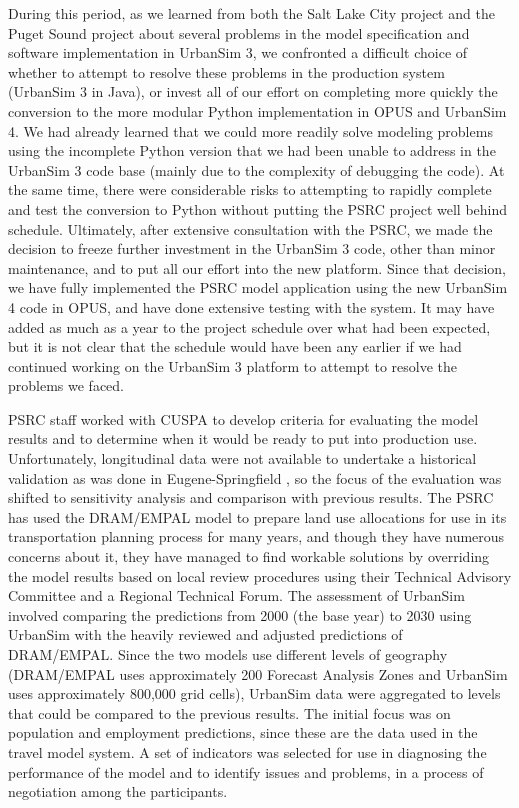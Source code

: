 During this period, as we learned from both the Salt Lake City
project and the Puget Sound project about several problems in the
model specification and software implementation in UrbanSim 3, we
confronted a difficult choice of whether to attempt to resolve these
problems in the production system (UrbanSim 3 in Java), or invest
all of our effort on completing more quickly the conversion to the
more modular Python implementation in OPUS and UrbanSim 4.  We had
already learned that we could more readily solve modeling problems
using the incomplete Python version that we had been unable to
address in the UrbanSim 3 code base (mainly due to the complexity of
debugging the code).  At the same time, there were considerable
risks to attempting to rapidly complete and test the conversion to
Python without putting the PSRC project well behind schedule.
Ultimately, after extensive consultation with the PSRC, we made the
decision to freeze further investment in the UrbanSim 3 code, other
than minor maintenance, and to put all our effort into the new
platform. Since that decision, we have fully implemented the PSRC
model application using the new UrbanSim 4 code in OPUS, and have
done extensive testing with the system.  It may have added as much
as a year to the project schedule over what had been expected, but
it is not clear that the schedule would have been any earlier if we
had continued working on the UrbanSim 3 platform to attempt to
resolve the problems we faced.

PSRC staff worked with CUSPA to develop criteria for evaluating the model
results and to determine when it would be ready to put into production use.
Unfortunately, longitudinal data were not available to undertake a
historical validation as was done in Eugene-Springfield
\cite{waddell-japa-2002}, so the focus of the evaluation was shifted to
sensitivity analysis and comparison with previous results. The PSRC has used
the DRAM/EMPAL model to prepare land use allocations for use in its
transportation planning process for many years, and though they have
numerous concerns about it, they have managed to find workable solutions by
overriding the model results based on local review procedures using their
Technical Advisory Committee and a Regional Technical Forum.  The
assessment of UrbanSim involved comparing the predictions from 2000 (the
base year) to 2030 using UrbanSim with the heavily reviewed and adjusted
predictions of DRAM/EMPAL\@.  Since the two models use different levels of
geography (DRAM/EMPAL uses approximately 200 Forecast Analysis Zones and
UrbanSim uses approximately 800,000 grid cells), UrbanSim data were
aggregated to levels that could be compared to the previous results. The
initial focus was on population and employment predictions, since these are
the data used in the travel model system.  A set of indicators was selected
for use in diagnosing the performance of the model and to identify issues
and problems, in a process of negotiation among the participants.

